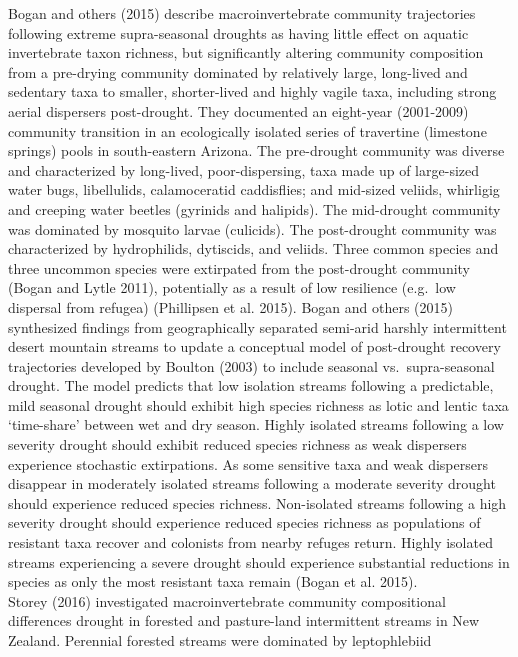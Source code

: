\documentclass[12pt,twoside]{reedthesis}
\theoremstyle{definition}
\theoremstyle{definition}
\theoremstyle{definition}
\theoremstyle{remark}
\begin{document}
Bogan and others (2015) describe macroinvertebrate community
trajectories following extreme supra-seasonal droughts as having little
effect on aquatic invertebrate taxon richness, but significantly
altering community composition from a pre-drying community dominated by
relatively large, long-lived and sedentary taxa to smaller,
shorter-lived and highly vagile taxa, including strong aerial dispersers
post-drought. They documented an eight-year (2001-2009) community
transition in an ecologically isolated series of travertine (limestone
springs) pools in south-eastern Arizona. The pre-drought community was
diverse and characterized by long-lived, poor-dispersing, taxa made up
of large-sized water bugs, libellulids, calamoceratid caddisflies; and
mid-sized veliids, whirligig and creeping water beetles (gyrinids and
halipids). The mid-drought community was dominated by mosquito larvae
(culicids). The post-drought community was characterized by
hydrophilids, dytiscids, and veliids. Three common species and three
uncommon species were extirpated from the post-drought community (Bogan
and Lytle 2011), potentially as a result of low resilience (e.g.~low
dispersal from refugea) (Phillipsen et al. 2015). Bogan and others
(2015) synthesized findings from geographically separated semi-arid
harshly intermittent desert mountain streams to update a conceptual
model of post-drought recovery trajectories developed by Boulton (2003)
to include seasonal vs.~supra-seasonal drought. The model predicts that
low isolation streams following a predictable, mild seasonal drought
should exhibit high species richness as lotic and lentic taxa
`time-share' between wet and dry season. Highly isolated streams
following a low severity drought should exhibit reduced species richness
as weak dispersers experience stochastic extirpations. As some sensitive
taxa and weak dispersers disappear in moderately isolated streams
following a moderate severity drought should experience reduced species
richness. Non-isolated streams following a high severity drought should
experience reduced species richness as populations of resistant taxa
recover and colonists from nearby refuges return. Highly isolated
streams experiencing a severe drought should experience substantial
reductions in species as only the most resistant taxa remain (Bogan et
al. 2015).\\
Storey (2016) investigated macroinvertebrate community compositional
differences drought in forested and pasture-land intermittent streams in
New Zealand. Perennial forested streams were dominated by leptophlebiid
\end{document}
